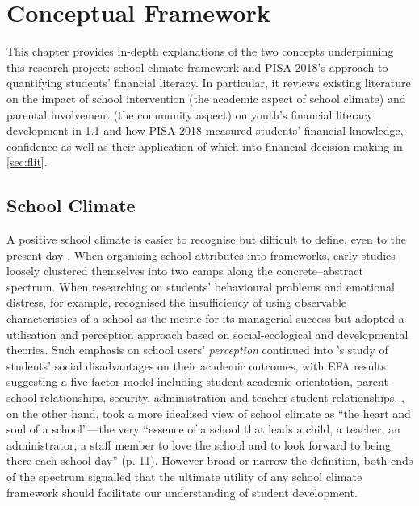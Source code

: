 \documentclass[a4paper,11pt,UKenglish,twoside,openright]{report}\usepackage[]{graphicx}\usepackage[]{color}
\begin{document}

\chapter{Conceptual Framework}
\label{chp:2}





This chapter provides in-depth explanations of the two concepts underpinning this research project:  school climate framework and PISA 2018's approach to quantifying students' financial literacy. In particular, it reviews existing literature on the impact of school intervention (the academic aspect of school climate) and parental involvement (the community aspect) on youth's financial literacy development in \cref{sec:sc} and how PISA 2018 measured students' financial knowledge, confidence as well as their application of which into financial decision-making in \cref{sec:flit}.

\section{School Climate}\label{sec:sc}

A positive school climate is easier to recognise but difficult to define, even to the present day \parencite{PISAvol3}. When organising school attributes into frameworks, early studies loosely clustered themselves into two camps along the concrete--abstract spectrum. When researching on students' behavioural problems and emotional distress, for example, \textcite{kuperminc:1997} recognised the insufficiency of using observable characteristics of a school as the metric for its managerial success but adopted a utilisation and perception approach based on social-ecological and developmental theories. Such emphasis on school users' \emph{perception} continued into \textcite{esposito:1999}'s study of students' social disadvantages on their academic outcomes, with EFA results suggesting a five-factor model including student academic orientation, parent-school relationships, security, administration and teacher-student relationships. \textcite{freiberg:1999}, on the other hand, took a more idealised view of school climate as ``the heart and soul of a school''---the very ``essence of a school that leads a child, a teacher, an administrator, a staff member to love the school and to look forward to being there each school day'' (p. 11). However broad or narrow the definition, both ends of the spectrum signalled that the ultimate utility of any school climate framework should facilitate our understanding of student development.
\end{document}
